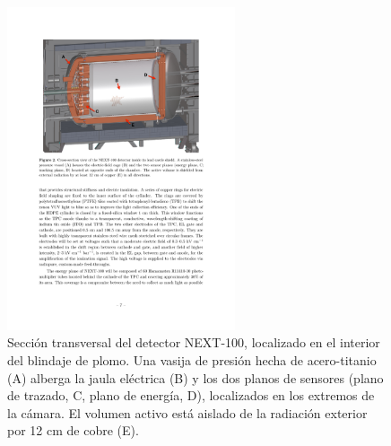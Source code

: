 \begin{figure}
\centering
\includegraphics[width=0.6\textwidth]{img/NEXT100.pdf}
\caption{\small Sección transversal del detector NEXT-100, localizado en el interior del blindaje de plomo. Una vasija de presión hecha de acero-titanio (A) alberga la jaula eléctrica (B) y los dos planos de sensores (plano de trazado, C, plano de energía, D), localizados en los extremos de la cámara. El volumen activo está aislado de la radiación exterior por 12 cm de cobre (E).
} \label{fig.NEXT100}
\end{figure}

